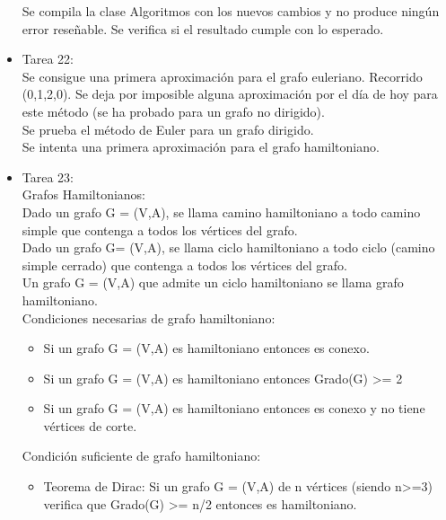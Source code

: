 \begin{itemize}
Se compila la clase Algoritmos con los nuevos cambios y no produce ningún error reseñable. Se verifica si el resultado cumple con lo esperado.\\

\item Tarea 22:\\
Se consigue una primera aproximación para el grafo euleriano. Recorrido (0,1,2,0). Se deja por imposible alguna aproximación por el día de hoy para este método (se ha probado para un grafo no dirigido).\\

Se prueba el método de Euler para un grafo dirigido.\\

Se intenta una primera aproximación para el grafo hamiltoniano.\\

\item Tarea 23:\\
 
Grafos Hamiltonianos:\\

Dado un grafo G = (V,A), se llama camino hamiltoniano a todo camino simple que contenga a todos los vértices del grafo.\\

Dado un grafo G= (V,A), se llama ciclo hamiltoniano a todo ciclo (camino simple cerrado) que contenga a todos los vértices del grafo.\\

Un grafo G = (V,A) que admite un ciclo hamiltoniano se llama grafo hamiltoniano.\\

Condiciones necesarias de grafo hamiltoniano:
\begin{itemize}
\item Si un grafo G = (V,A) es hamiltoniano entonces es conexo.
\item Si un grafo G = (V,A) es hamiltoniano entonces Grado(G) >= 2
\item Si un grafo G = (V,A) es hamiltoniano entonces es conexo y no tiene vértices de corte.
\end{itemize}

Condición suficiente de grafo hamiltoniano:
\begin{itemize}
\item Teorema de Dirac: Si un grafo G = (V,A) de n vértices (siendo n>=3) verifica que Grado(G) >= n/2 entonces es hamiltoniano.
\end{itemize}


\end{itemize}
